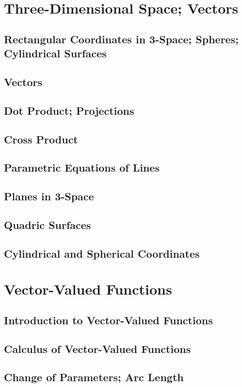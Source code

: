 \documentclass[]{article}
\begin{document}
\section{Three-Dimensional Space; Vectors}
\subsection{Rectangular Coordinates in 3-Space; Spheres; Cylindrical Surfaces}
\subsection{Vectors}
\subsection{Dot Product; Projections}
\subsection{Cross Product}
\subsection{Parametric Equations of Lines}
\subsection{Planes in 3-Space}
\subsection{Quadric Surfaces}
\subsection{Cylindrical and Spherical Coordinates}
\section{Vector-Valued Functions}
\subsection{Introduction to Vector-Valued Functions}
\subsection{Calculus of Vector-Valued Functions}
\subsection{Change of Parameters; Arc Length}
\end{document}
